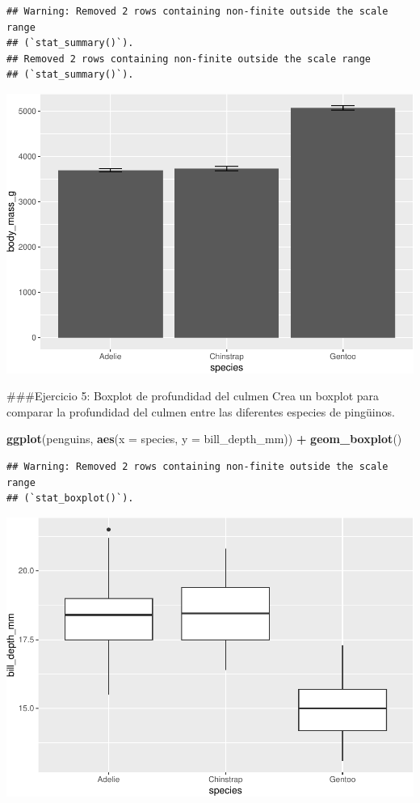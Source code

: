 \documentclass[
]{book}
\newenvironment{Shaded}{\begin{snugshade}}{\end{snugshade}}
\newcommand{\AttributeTok}[1]{\textcolor[rgb]{0.13,0.29,0.53}{#1}}
\newcommand{\FunctionTok}[1]{\textcolor[rgb]{0.13,0.29,0.53}{\textbf{#1}}}
\newcommand{\NormalTok}[1]{#1}
\newcommand{\SpecialCharTok}[1]{\textcolor[rgb]{0.81,0.36,0.00}{\textbf{#1}}}
\begin{document}
\begin{verbatim}
## Warning: Removed 2 rows containing non-finite outside the scale range
## (`stat_summary()`).
## Removed 2 rows containing non-finite outside the scale range
## (`stat_summary()`).
\end{verbatim}

\includegraphics{bookdown-demo_files/figure-latex/unnamed-chunk-180-1.pdf}

\#\#\#Ejercicio 5: Boxplot de profundidad del culmen
Crea un boxplot para comparar la profundidad del culmen entre las diferentes especies de pingüinos.

\begin{Shaded}
\begin{Highlighting}[]
\FunctionTok{ggplot}\NormalTok{(penguins, }\FunctionTok{aes}\NormalTok{(}\AttributeTok{x =}\NormalTok{ species, }\AttributeTok{y =}\NormalTok{ bill\_depth\_mm)) }\SpecialCharTok{+}
  \FunctionTok{geom\_boxplot}\NormalTok{()}
\end{Highlighting}
\end{Shaded}

\begin{verbatim}
## Warning: Removed 2 rows containing non-finite outside the scale range
## (`stat_boxplot()`).
\end{verbatim}

\includegraphics{bookdown-demo_files/figure-latex/unnamed-chunk-181-1.pdf}
\end{document}
